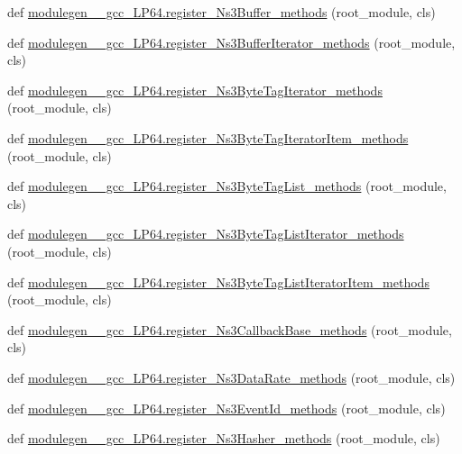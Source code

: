 \begin{DoxyCompactItemize}
\item 
def \hyperlink{namespacemodulegen____gcc__LP64_ad545f8eb2320e09bf6e5be02690b4eaa}{modulegen\+\_\+\+\_\+gcc\+\_\+\+L\+P64.\+register\+\_\+\+Ns3\+Buffer\+\_\+methods} (root\+\_\+module, cls)
\item 
def \hyperlink{namespacemodulegen____gcc__LP64_a219f36a56f22b6e50de65d276cdf742d}{modulegen\+\_\+\+\_\+gcc\+\_\+\+L\+P64.\+register\+\_\+\+Ns3\+Buffer\+Iterator\+\_\+methods} (root\+\_\+module, cls)
\item 
def \hyperlink{namespacemodulegen____gcc__LP64_ae692c5fa47566ed6b225ae5a5ca35235}{modulegen\+\_\+\+\_\+gcc\+\_\+\+L\+P64.\+register\+\_\+\+Ns3\+Byte\+Tag\+Iterator\+\_\+methods} (root\+\_\+module, cls)
\item 
def \hyperlink{namespacemodulegen____gcc__LP64_ade2c2970e32bf8b776b3624afcc4082d}{modulegen\+\_\+\+\_\+gcc\+\_\+\+L\+P64.\+register\+\_\+\+Ns3\+Byte\+Tag\+Iterator\+Item\+\_\+methods} (root\+\_\+module, cls)
\item 
def \hyperlink{namespacemodulegen____gcc__LP64_ad929f8749eef52cadc734fee358cacd9}{modulegen\+\_\+\+\_\+gcc\+\_\+\+L\+P64.\+register\+\_\+\+Ns3\+Byte\+Tag\+List\+\_\+methods} (root\+\_\+module, cls)
\item 
def \hyperlink{namespacemodulegen____gcc__LP64_aa7b7804ddcf3a3b4d83820f193414ea4}{modulegen\+\_\+\+\_\+gcc\+\_\+\+L\+P64.\+register\+\_\+\+Ns3\+Byte\+Tag\+List\+Iterator\+\_\+methods} (root\+\_\+module, cls)
\item 
def \hyperlink{namespacemodulegen____gcc__LP64_a262c89a667105a6a7bc764058f464ab3}{modulegen\+\_\+\+\_\+gcc\+\_\+\+L\+P64.\+register\+\_\+\+Ns3\+Byte\+Tag\+List\+Iterator\+Item\+\_\+methods} (root\+\_\+module, cls)
\item 
def \hyperlink{namespacemodulegen____gcc__LP64_a911c07db6d52106940012fbb077a0853}{modulegen\+\_\+\+\_\+gcc\+\_\+\+L\+P64.\+register\+\_\+\+Ns3\+Callback\+Base\+\_\+methods} (root\+\_\+module, cls)
\item 
def \hyperlink{namespacemodulegen____gcc__LP64_acee8aed9090be58f00e76c4c73ae1396}{modulegen\+\_\+\+\_\+gcc\+\_\+\+L\+P64.\+register\+\_\+\+Ns3\+Data\+Rate\+\_\+methods} (root\+\_\+module, cls)
\item 
def \hyperlink{namespacemodulegen____gcc__LP64_a11034b778f9a07d9c47a0824be6df6c6}{modulegen\+\_\+\+\_\+gcc\+\_\+\+L\+P64.\+register\+\_\+\+Ns3\+Event\+Id\+\_\+methods} (root\+\_\+module, cls)
\item 
def \hyperlink{namespacemodulegen____gcc__LP64_a6615c86326777b99b9d48f2543fa24fb}{modulegen\+\_\+\+\_\+gcc\+\_\+\+L\+P64.\+register\+\_\+\+Ns3\+Hasher\+\_\+methods} (root\+\_\+module, cls)

\end{DoxyCompactItemize}
